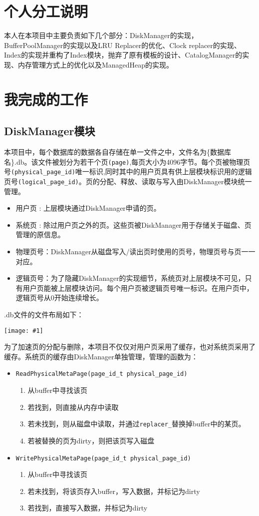 \documentclass[12pt, a4paper]{article}
\author{\sz{20}{\b{张峻瑜}}}
\title{\sz{30}{\b{MiniSQL个人详细报告}\vspace{+4ex}}}
\date{\sz{20}{\b{时间：2022年6月4日}}}
\def\c#1{\texttt{#1}}
\def\s#1{\section{#1}}
\def\ss#1{\subsection{#1}}
\def\p{\par}
\def\g#1{\begin{center}\texttt{[image: \#1]}\end{center}}
\begin{document}
\maketitle
\newpage
\tableofcontents
\s{个人分工说明}
\p 本人在本项目中主要负责如下几个部分：DiskManager的实现，BufferPoolManager的实现以及LRU Replacer的优化、Clock replacer的实现、Index的实现并重构了Index模块，抛弃了原有模板的设计、CatalogManager的实现、内存管理方式上的优化以及ManagedHeap的实现。
\s{我完成的工作}

\ss{DiskManager模块}
本项目中，每个数据库的数据各自存储在单一文件之中，文件名为\{数据库名\}.db。该文件被划分为若干个页\c{(page)},每页大小为4096字节。每个页被物理页号\c{(physical\_page\_id)}唯一标识,同时其中的用户页具有供上层模块标识用的逻辑页号\c{(logical\_page\_id)}。页的分配、释放、读取与写入由DiskManager模块统一管理。
\begin{itemize}
	\item 用户页 : 上层模块通过DiskManager申请的页。
 \item 系统页 : 除过用户页之外的页。这些页被DiskManager用于存储关于磁盘、页管理的原信息。
 \item 物理页号：DiskManager从磁盘写入/读出页时使用的页号，物理页号与页一一对应。
 \item 逻辑页号：为了隐藏DiskManager的实现细节，系统页对上层模块不可见，只有用户页能被上层模块访问。每个用户页被逻辑页号唯一标识。在用户页中，逻辑页号从0开始连续增长。
\end{itemize}
\p .db文件的文件布局如下：
\g{file_layout.pdf}
\p 为了加速页的分配与删除，本项目不仅仅对用户页采用了缓存，也对系统页采用了缓存。系统页的缓存由DiskManager单独管理，管理的函数为：
\begin{itemize}
	\item \c{ReadPhysicalMetaPage(page\_id\_t physical\_page\_id)}\begin{enumerate}
		\item 从buffer中寻找该页
  \item 若找到，则直接从内存中读取
  \item 若未找到，则从磁盘中读取，并通过\c{replacer\_}替换掉buffer中的某页。
  \item 若被替换的页为dirty，则把该页写入磁盘
	\end{enumerate}
 \item \c{WritePhysicalMetaPage(page\_id\_t physical\_page\_id)}\begin{enumerate}
	 \item 从buffer中寻找该页
  \item 若未找到，将该页存入buffer，写入数据，并标记为dirty
  \item 若找到，直接写入数据，并标记为dirty
 \end{enumerate}
\end{itemize}
\end{document}
